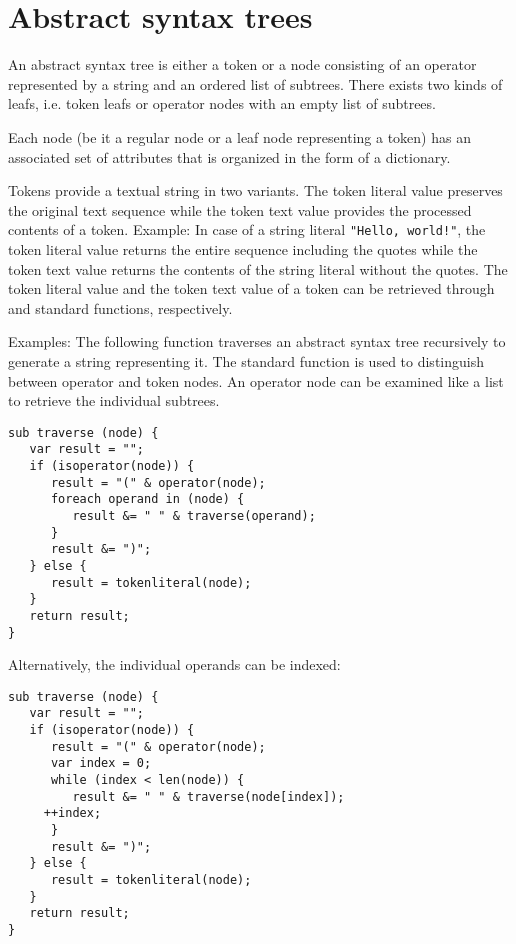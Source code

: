 \section{Abstract syntax trees}

An abstract syntax tree is either a token or a
node consisting of an operator
represented by a string and an ordered list of subtrees.
There exists two kinds of leafs, i.e. token
leafs or operator nodes with an empty list of subtrees.

Each node (be it a regular node or a leaf node representing a token)
has an associated set of attributes that is organized in the form
of a dictionary.

Tokens provide a textual string in two variants. The token
literal value preserves the original
text sequence while the token text value
provides the processed contents of a token. Example: In case of a
string literal \lstinline+"Hello, world!"+, the token literal value
returns the entire sequence including the quotes while the token
text value returns the contents of the string literal without the
quotes. The token literal value and the token text value of a token
can be retrieved through  and
 standard functions, respectively.

Examples: The following function  traverses an
abstract syntax tree recursively to generate a string representing it.
The standard function  is used to distinguish between
operator and token nodes. An operator node can be examined like a list
to retrieve the individual subtrees.

\begin{lstlisting}
sub traverse (node) {
   var result = "";
   if (isoperator(node)) {
      result = "(" & operator(node);
      foreach operand in (node) {
         result &= " " & traverse(operand);
      }
      result &= ")";
   } else {
      result = tokenliteral(node);
   }
   return result;
}
\end{lstlisting}

\noindent
Alternatively, the individual operands can be indexed:

\begin{lstlisting}
sub traverse (node) {
   var result = "";
   if (isoperator(node)) {
      result = "(" & operator(node);
      var index = 0;
      while (index < len(node)) {
         result &= " " & traverse(node[index]);
	 ++index;
      }
      result &= ")";
   } else {
      result = tokenliteral(node);
   }
   return result;
}
\end{lstlisting}

